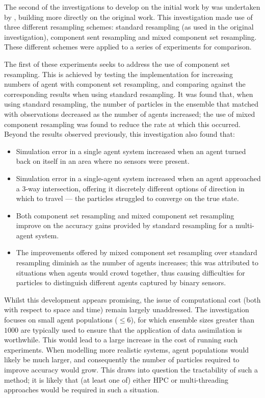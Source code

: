 The second of the investigations to develop on the initial work by
\citet{wang2013data} was undertaken by \citet{wang2015data}, building more
directly on the original work.
This investigation made use of three different resampling schemes: standard
resampling (as used in the original investigation), component sent resampling
and mixed component set resampling.
These different schemes were applied to a series of experiments for comparison.

The first of these experiments seeks to address the use of component set
resampling.
This is achieved by testing the implementation for increasing numbers of agent
with component set resampling, and comparing against the corresponding results
when using standard resampling.
It was found that, when using standard resampling, the number of particles in
the ensemble that matched with observations decreased as the number of agents
increased; the use of mixed component resampling was found to reduce the rate at
which this occurred.
Beyond the results observed previously, this investigation also found that:
\begin{itemize}
    \item Simulation error in a single agent system increased when an agent
        turned back on itself in an area where no sensors were present.
    \item Simulation error in a single-agent system increased when an agent
        approached a 3-way intersection, offering it discretely different
        options of direction in which to travel --- the particles struggled to
        converge on the true state.
    \item Both component set resampling and mixed component set resampling
        improve on the accuracy gains provided by standard resampling for a
        multi-agent system.
    \item The improvements offered by mixed component set resampling over
        standard resampling diminish as the number of agents increases; this was
        attributed to situations when agents would crowd together, thus causing
        difficulties for particles to distinguish different agents captured by
        binary sensors.
\end{itemize}
Whilst this development appears promising, the issue of computational cost (both
with respect to space and time) remain largely unaddressed.
The investigation focuses on small agent populations ($\leq 6$), for which
ensemble sizes greater than $1000$ are typically used to ensure that the
application of data assimilation is worthwhile.
This would lead to a large increase in the cost of running such experiments. 
When modelling more realistic systems, agent populations would likely be much
larger, and consequently the number of particles required to improve accuracy
would grow.
This draws into question the tractability of such a method; it is likely that
(at least one of) either HPC or multi-threading approaches would be required in
such a situation.


